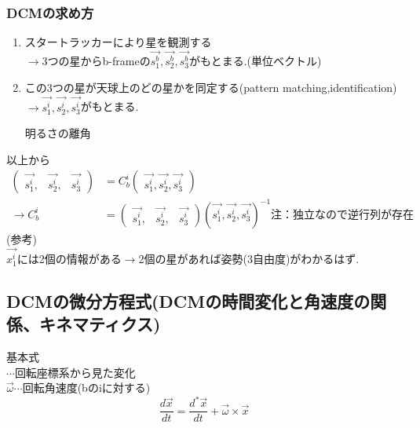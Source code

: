 \documentclass[class=article, crop=false, preview=false, dvipdfmx, a4paper]{standalone}
\begin{document}
\subsubsection{DCMの求め方}
\begin{enumerate}[label = \maru{\theenumi}]
\item スタートラッカーにより星を観測する\\
$\rightarrow$3つの星からb-frameの$\vec{s^b_1},\vec{s^b_2},\vec{s^b_3}$がもとまる.(単位ベクトル)
\item この3つの星が天球上のどの星かを同定する(pattern matching,identification)\\
$\rightarrow\vec{s^i_1},\vec{s^i_2},\vec{s^i_3}$がもとまる.
\hfil
\begin{minipage}{2.3cm}
\begin{figure}[H]
\end{figure}
\end{minipage}
明るさの離角
\end{enumerate}

以上から
\begin{align}
\begin{pmatrix}
	\vec{s^i_1}, & \vec{s^i_2}, & \vec{s^i_3}
\end{pmatrix}
& = 
C^i_b
\begin{pmatrix}
	\vec{s^i_1},\vec{s^i_2},\vec{s^i_3}
\end{pmatrix}
\\
\rightarrow 
C^i_b & = 
\begin{pmatrix}
\vec{s^i_1}, & \vec{s^i_2}, & \vec{s^i_3}
\end{pmatrix}
\left( \vec{s^i_1},\vec{s^i_2},\vec{s^i_3} \right)^{-1}\mbox{注：独立なので逆行列が存在}
\end{align}
(参考)\\
$\vec{x^i_1}$には2個の情報がある$\rightarrow$2個の星があれば姿勢(3自由度)がわかるはず.


\subsection{DCMの微分方程式(DCMの時間変化と角速度の関係、キネマティクス)}
 基本式\\
\text{*}$\cdots$回転座標系から見た変化\\
$\vec{\omega}\cdots$回転角速度(bのiに対する)
\[ \frac{d\vec{x}}{dt}=\frac{d^*\vec{x}}{dt}+\vec{\omega}\times\vec{x} \]
\end{document}
